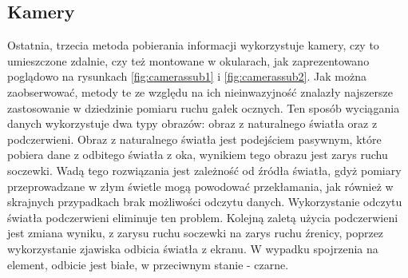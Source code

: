 \subsection{Kamery}
\label{ssec:cameras}
Ostatnia, trzecia metoda pobierania informacji wykorzystuje kamery, czy to umieszczone zdalnie, czy też montowane w okularach, jak zaprezentowano poglądowo na rysunkach \ref{fig:camerassub1} i \ref{fig:camerassub2}. Jak można zaobserwować, metody te ze względu na ich nieinwazyjność znalazły najszersze zastosowanie w dziedzinie pomiaru ruchu gałek ocznych. Ten sposób wyciągania danych wykorzystuje dwa typy obrazów: obraz z naturalnego światła oraz z podczerwieni. Obraz z naturalnego światła jest podejściem pasywnym, które pobiera dane z odbitego światła z oka, wynikiem tego obrazu jest zarys ruchu soczewki. Wadą tego rozwiązania jest zależność od źródła światła, gdyż pomiary przeprowadzane w złym świetle mogą powodować przekłamania, jak również w skrajnych przypadkach brak możliwości odczytu danych. Wykorzystanie odczytu światła podczerwieni eliminuje ten problem. Kolejną zaletą użycia podczerwieni jest zmiana wyniku, z zarysu ruchu soczewki na zarys ruchu źrenicy, poprzez wykorzystanie zjawiska odbicia światła z ekranu. W wypadku spojrzenia na element, odbicie jest białe, w przeciwnym stanie - czarne.
